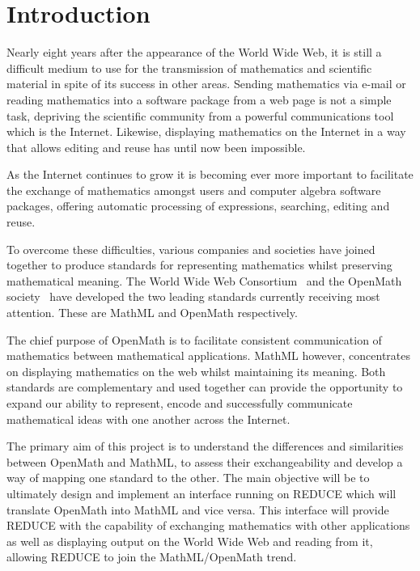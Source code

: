 \chapter{Introduction}

Nearly eight years after the appearance of the World Wide Web, it is still a difficult medium to use for the transmission
of mathematics and scientific material in spite of its success in other areas. Sending mathematics via e-mail or reading
mathematics into a software package from a web page is not a simple task, depriving the scientific community from a
powerful communications tool which is the Internet. Likewise, displaying mathematics on the Internet in a way that allows
editing and reuse has until now been impossible.

As the Internet continues to grow it is becoming ever more important to facilitate the exchange of mathematics amongst
users and computer algebra software packages, offering automatic processing of expressions, searching, editing and reuse.

To overcome these difficulties, various companies and societies have joined together to produce standards for representing mathematics whilst
preserving mathematical meaning. The World Wide Web Consortium~\cite{w3c} and the OpenMath society~\cite{openmath} have developed the two leading standards currently receiving most attention. These are MathML
\cite{mathml} and OpenMath \cite{openmathspec} respectively.

The chief purpose of OpenMath is to facilitate consistent communication of mathematics between
mathematical applications. MathML however, concentrates on displaying mathematics on the web whilst
maintaining its meaning. Both standards are complementary and used together can provide the opportunity to expand our
ability to represent, encode and successfully communicate mathematical ideas with one another across the Internet.

The primary aim of this project is to understand the differences and similarities between OpenMath and
MathML, to assess their exchangeability and develop a way of mapping one standard to the other. The main
objective will be to ultimately design and implement an interface running on REDUCE which will translate
OpenMath into MathML and vice versa. This interface will provide REDUCE with
the capability of exchanging mathematics with other applications as well as displaying output on the World Wide Web and
reading from it, allowing REDUCE to join the MathML/OpenMath trend.

